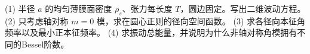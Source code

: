 (1) 半径 \(a\) 的均匀薄膜面密度 \(\rho_s\)、张力每长度 \(T\)，圆边固定。写出二维波动方程。
(2) 只考虑轴对称 \(m=0\) 模，求在圆心正则的径向空间函数。
(3) 求各径向本征角频率以及最小正本征频率。
(4) 求振动总能量，并说明为什么非轴对称角模拥有不同的Bessel阶数。
